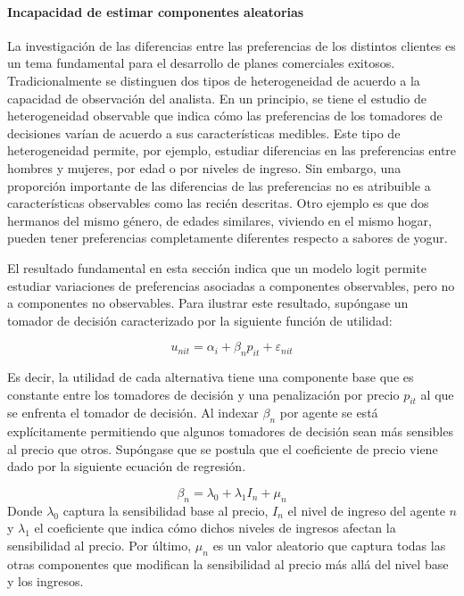 \documentclass[
]{book}
\begin{document}
\hypertarget{incapacidad-de-estimar-componentes-aleatorias}{%
\paragraph*{Incapacidad de estimar componentes aleatorias}\label{incapacidad-de-estimar-componentes-aleatorias}}

La investigación de las diferencias entre las preferencias de los distintos clientes es un tema fundamental para el desarrollo de planes comerciales exitosos. Tradicionalmente se distinguen dos tipos de heterogeneidad de acuerdo a la capacidad de observación del analista. En un principio, se tiene el estudio de heterogeneidad observable que indica cómo las preferencias de los tomadores de decisiones varían de acuerdo a sus características medibles. Este tipo de heterogeneidad permite, por ejemplo, estudiar diferencias en las preferencias entre hombres y mujeres, por edad o por niveles de ingreso. Sin embargo, una proporción importante de las diferencias de las preferencias no es atribuible a características observables como las recién descritas. Otro ejemplo es que dos hermanos del mismo género, de edades similares, viviendo en el mismo hogar, pueden tener preferencias completamente diferentes respecto a sabores de yogur.

El resultado fundamental en esta sección indica que un modelo logit permite estudiar variaciones de preferencias asociadas a componentes observables, pero no a componentes no observables.
Para ilustrar este resultado, supóngase un tomador de decisión caracterizado por la siguiente función de utilidad:

\[u_{nit} = \alpha_i + \beta_np_{it} + \varepsilon_{nit}\]

Es decir, la utilidad de cada alternativa tiene una componente base que es constante entre los tomadores de decisión y una penalización por precio \(p_{it}\) al que se enfrenta el tomador de decisión. Al indexar \(β_n\) por agente se está explícitamente permitiendo que algunos tomadores de decisión sean más sensibles al precio que otros. Supóngase que se postula que el coeficiente de precio viene dado por la siguiente ecuación de regresión.

\[\beta_n = \lambda_0 + \lambda_1I_n + \mu_n\]
Donde \(\lambda_0\) captura la sensibilidad base al precio, \(I_n\) el nivel de ingreso del agente \(n\) y \(\lambda_1\) el coeficiente que indica cómo dichos niveles de ingresos afectan la sensibilidad al precio. Por último, \(\mu_n\) es un valor aleatorio que captura todas las otras componentes que modifican la sensibilidad al precio más allá del nivel base y los ingresos.
\end{document}
